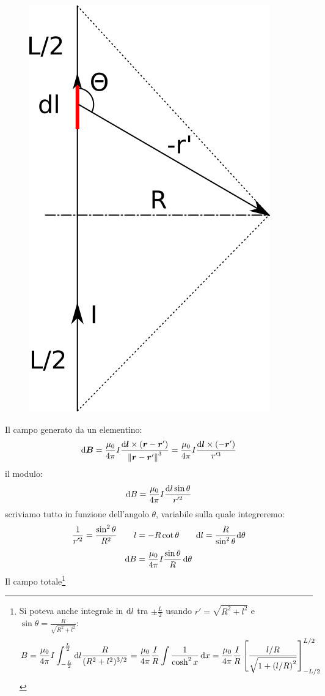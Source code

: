\begin{Es}
\begin{figure}[htbp]
    \includegraphics[scale=0.6]{immagini/fisica2/filo_spiraquadrata}
  \end{figure}
  Il campo generato da un elementino:
  \[
    \mathrm{d}\boldsymbol{B} = \frac{\mu_0}{4\pi}I\frac{\mathrm{d}\boldsymbol{l}\times(\boldsymbol{r}-\boldsymbol{r}')}{\left\lVert\boldsymbol{r}-\boldsymbol{r}'\right\rVert^3}=\frac{\mu_0}{4\pi}I\frac{\mathrm{d}\boldsymbol{l}\times(-\boldsymbol{r}')}{r'^3}
  \]
  il modulo:
  \[
    \mathrm{d} B = \frac{\mu_0}{4\pi}I\frac{\mathrm{d} l\sin\theta}{r'^2}
  \]
  scriviamo tutto in funzione dell'angolo $\theta$, variabile sulla quale integreremo:
  \[
    \frac{1}{r'^2} = \frac{\sin^2\theta}{R^2}\qquad l = -R\cot\theta\qquad\mathrm{d} l = \frac{R}{\sin^2\theta}\mathrm{d}\theta
  \]
  \[
    \mathrm{d} B = \frac{\mu_0}{4\pi}I\frac{\sin\theta}{R}\,\mathrm{d}\theta
  \]
  Il campo totale\footnote{Si poteva anche integrale in $\mathrm{d} l$ tra $\pm\frac{L}{2}$ usando $r'=\sqrt{R^2+l^2}$ e $\sin\theta=\frac{R}{\sqrt{R^2+l^2}}$:
    \[
      B = \frac{\mu_0}{4\pi}I\int_{-\frac{L}{2}}^{\frac{L}{2}}\mathrm{d} l\frac{R}{(R^2+l^2)^{3/2}}=\frac{\mu_0}{4\pi}\frac{I}{R}\int\frac{1}{\cosh^2 x}\,\mathrm{d} x=\frac{\mu_0}{4\pi}\frac{I}{R}\left[\frac{l/R}{\sqrt{1+\left(l/R\right)^2}}\right]_{-L/2}^{L/2}
\]}
\end{Es}
